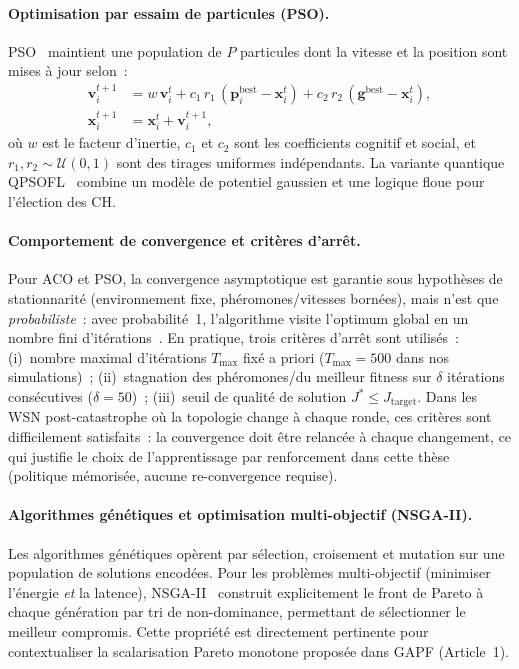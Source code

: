 \paragraph{Optimisation par essaim de particules (PSO).}
PSO~\cite{kennedy1995pso} maintient une population de $P$ particules dont la vitesse et la position sont mises à jour selon~:
\begin{align}
  \mathbf{v}_i^{t+1} &= w\,\mathbf{v}_i^t + c_1\,r_1\,(\mathbf{p}_i^\text{best} - \mathbf{x}_i^t) + c_2\,r_2\,(\mathbf{g}^\text{best} - \mathbf{x}_i^t), \label{eq:pso-v}\\
  \mathbf{x}_i^{t+1} &= \mathbf{x}_i^t + \mathbf{v}_i^{t+1}, \label{eq:pso-x}
\end{align}
où $w$ est le facteur d'inertie, $c_1$ et $c_2$ sont les coefficients cognitif et social, et $r_1, r_2 \sim \mathcal{U}(0,1)$ sont des tirages uniformes indépendants. La variante quantique QPSOFL~\cite{hu_energy_2024} combine un modèle de potentiel gaussien et une logique floue pour l'élection des CH.

\paragraph{Comportement de convergence et critères d'arrêt.}
Pour ACO et PSO, la convergence asymptotique est garantie sous hypothèses de stationnarité (environnement fixe, phéromones/vitesses bornées), mais n'est que \emph{probabiliste}~: avec probabilité~1, l'algorithme visite l'optimum global en un nombre fini d'itérations~\cite{dorigo2004ant}. En pratique, trois critères d'arrêt sont utilisés~: (i)~nombre maximal d'itérations $T_{\max}$ fixé a priori ($T_{\max} = 500$ dans nos simulations)~; (ii)~stagnation des phéromones/du meilleur fitness sur $\delta$ itérations consécutives ($\delta = 50$)~; (iii)~seuil de qualité de solution $J^* \leq J_{\text{target}}$. Dans les WSN post-catastrophe où la topologie change à chaque ronde, ces critères sont difficilement satisfaits~: la convergence doit être relancée à chaque changement, ce qui justifie le choix de l'apprentissage par renforcement dans cette thèse (politique mémorisée, aucune re-convergence requise).

\paragraph{Algorithmes génétiques et optimisation multi-objectif (NSGA-II).}
Les algorithmes génétiques opèrent par sélection, croisement et mutation sur une population de solutions encodées. Pour les problèmes multi-objectif (minimiser l'énergie \emph{et} la latence), NSGA-II~\cite{deb2002nsga2} construit explicitement le front de Pareto à chaque génération par tri de non-dominance, permettant de sélectionner le meilleur compromis. Cette propriété est directement pertinente pour contextualiser la scalarisation Pareto monotone proposée dans GAPF (Article~1).

